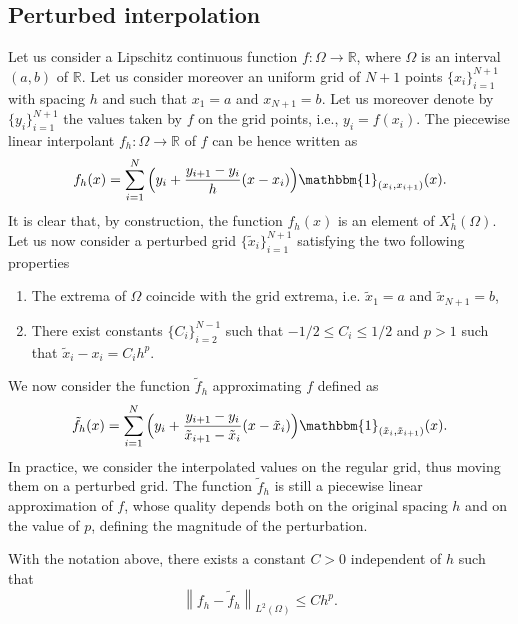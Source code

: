 \documentclass{siamart1116}
\numberwithin{theorem}{section}
\newcommand{\norm}[1]{\left\lVert#1\right\rVert}
\newcommand{\R}{\mathbb{R}}
\newcommand{\ind}[1]{\mathbbm{1}_{#1}}
\begin{document}
\subsection{Perturbed interpolation} Let us consider a Lipschitz continuous function $f\colon\Omega\to\R$, where $\Omega$ is an interval $(a, b)$ of $\R$. Let us consider moreover an uniform grid of $N+1$ points $\{x_i\}_{i=1}^{N+1}$ with spacing $h$ and such that $x_1 = a$ and $x_{N+1} = b$. Let us moreover denote by $\{y_i\}_{i=1}^{N+1}$ the values taken by $f$ on the grid points, i.e., $y_i = f(x_i)$. The piecewise linear interpolant $f_h\colon\Omega\to\R$ of $f$ can be hence written as
\begin{equation}
	f_h(x) = \sum_{i=1}^{N} \Big(y_i + \frac{y_{i+1} - y_i}{h}(x - x_i)\Big)\ind{(x_i, x_{i+1})}(x).
\end{equation}
It is clear that, by construction, the function $f_h(x)$ is an element of $X_h^1(\Omega)$. Let us now consider a perturbed grid $\{\tilde x_i\}_{i=1}^{N+1}$ satisfying the two following properties
\begin{enumerate}
	\item The extrema of $\Omega$ coincide with the grid extrema, i.e. $\tilde x_1 = a$ and $\tilde x_{N+1} = b$,
	\item There exist constants $\{C_i\}_{i=2}^{N-1}$ such that $-1/2 \leq C_i \leq 1/2$ and $p > 1$ such that $\tilde x_i - x_i = C_ih^p$.
\end{enumerate}
We now consider the function $\tilde f_h$ approximating $f$ defined as
\begin{equation}
	\tilde f_h(x) = \sum_{i=1}^{N} \Big(y_i + \frac{y_{i+1} - y_i}{\tilde x_{i+1} - \tilde x_i}(x - \tilde x_i)\Big)\ind{(\tilde x_i, \tilde x_{i+1})}(x).
\end{equation}
In practice, we consider the interpolated values on the regular grid, thus moving them on a perturbed grid. The function $\tilde f_h$ is still a piecewise linear approximation of $f$, whose quality depends both on the original spacing $h$ and on the value of $p$, defining the magnitude of the perturbation.
\begin{lemma}\label{lem:Interp1D} With the notation above, there exists a constant $C > 0$ independent of $h$ such that
\begin{equation}
	\norm{f_h - \tilde f_h}_{L^2(\Omega)} \leq C h^p.
\end{equation}
\end{lemma}
\end{document}

